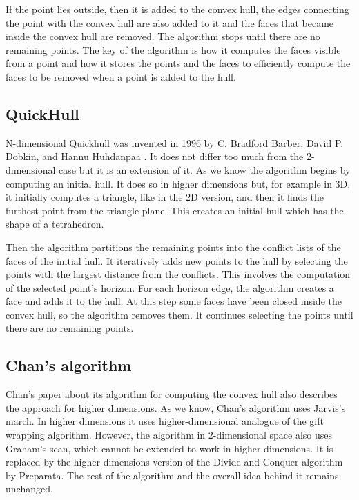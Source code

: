 \documentclass{article}
\begin{document}
If the point lies outside, then it is added to the convex hull, the edges connecting the point with the convex hull are also added to it and the faces that became inside the convex hull are removed. The algorithm stops until there are no remaining points. The key of the algorithm is how it computes the faces visible from a point and how it stores the points and the faces to efficiently compute the faces to be removed when a point is added to the hull.

\subsection{QuickHull}

N-dimensional Quickhull was invented in 1996 by C. Bradford Barber, David P. Dobkin, and Hannu Huhdanpaa \cite{quickhull3D}. It does not differ too much from the 2-dimensional case but it is an extension of it. As we know the algorithm begins by computing an initial hull. It does so in higher dimensions but, for example in 3D, it initially computes a triangle, like in the 2D version, and then it finds the furthest point from the triangle plane. This creates an initial hull which has the shape of a tetrahedron. 

Then the algorithm partitions the remaining points into the conflict lists of the faces of the initial hull. It iteratively adds new points to the hull by selecting the points with the largest distance from the conflicts. This involves the computation of the selected point's horizon. For each horizon edge, the algorithm creates a face and adds it to the hull. At this step some faces have been closed inside the convex hull, so the algorithm removes them. It continues selecting the points until there are no remaining points.

\subsection{Chan's algorithm}

Chan's paper about its algorithm for computing the convex hull also describes the approach for higher dimensions. As we know, Chan's algorithm uses Jarvis's march. In higher dimensions it uses higher-dimensional analogue of the gift wrapping algorithm. However, the algorithm in 2-dimensional space also uses Graham's scan, which cannot be extended to work in higher dimensions. It is replaced by the higher dimensions version of the Divide and Conquer algorithm by Preparata. The rest of the algorithm and the overall idea behind it remains unchanged.
\end{document}
